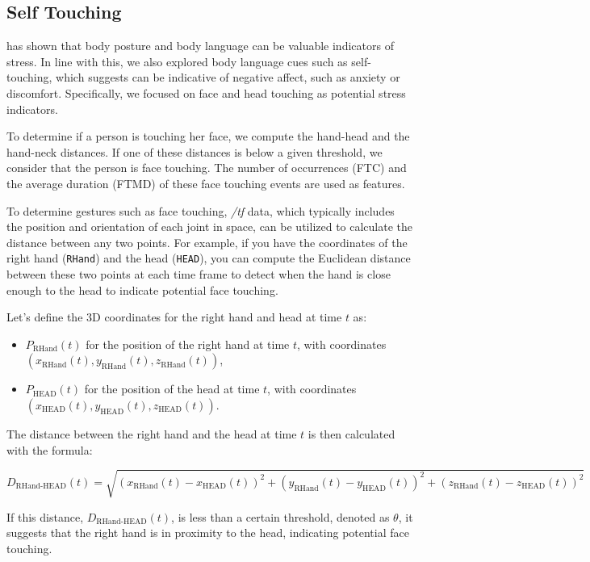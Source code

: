 \subsection*{Self Touching} 
\textcite{10.1371/journal.pone.0043571} has shown that body posture and body language can be valuable indicators of stress. In line with this, we also explored body language cues such as self-touching, which \textcite{HARRIGAN19851161}suggests can be indicative of negative affect, such as anxiety or discomfort. Specifically, we focused on face and head touching as potential stress indicators.

To determine if a person is touching her face, we compute the hand-head and the hand-neck distances. If one of these distances is below a given threshold, we consider that the person is face touching. The number of occurrences (FTC) and the average duration (FTMD) of these face touching events are used as features. 

To determine gestures such as face touching, \textit{/tf} data, which typically includes the position and orientation of each joint in space, can be utilized to calculate the distance between any two points. For example, if you have the coordinates of the right hand (\texttt{RHand}) and the head (\texttt{HEAD}), you can compute the Euclidean distance between these two points at each time frame to detect when the hand is close enough to the head to indicate potential face touching.

Let's define the 3D coordinates for the right hand and head at time $t$ as:
\begin{itemize}
\item $P_{\text{RHand}}(t)$ for the position of the right hand at time $t$, with coordinates $(x_{\text{RHand}}(t), y_{\text{RHand}}(t), z_{\text{RHand}}(t))$,
\item $P_{\text{HEAD}}(t)$ for the position of the head at time $t$, with coordinates $(x_{\text{HEAD}}(t), y_{\text{HEAD}}(t), z_{\text{HEAD}}(t))$.
\end{itemize}

The distance between the right hand and the head at time $t$ is then calculated with the formula:

\begin{equation}
D_{\text{RHand-HEAD}}(t) = \sqrt{(x_{\text{RHand}}(t) - x_{\text{HEAD}}(t))^2 + (y_{\text{RHand}}(t) - y_{\text{HEAD}}(t))^2 + (z_{\text{RHand}}(t) - z_{\text{HEAD}}(t))^2}
\end{equation}

If this distance, $D_{\text{RHand-HEAD}}(t)$, is less than a certain threshold, denoted as $\theta$, it suggests that the right hand is in proximity to the head, indicating potential face touching.

